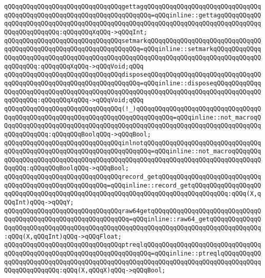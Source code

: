 \verb|qQQqqQQqqQQqqQQqqQQqqQQqqQQqqQQqgettagqQQqqQQqqQQqqQQqqQQqqQQqqQQqqQQqqQQqqQQqqQQqqQQqqQQqqQQqqQQqqQQqqQQqqQQq=qQQqinline::gettagqQQqqQQqqQQqqQQqqQQqqQQqqQQqqQQqqQQqqQQqqQQqqQQqqQQqqQQqqQQqqQQqqQQqqQQqqQQqqQQqqQQqqQQqqQQqqQQq:qQQqqQQqXqQQq->qQQqInt;|\newline
\verb|qQQqqQQqqQQqqQQqqQQqqQQqqQQqqQQqsetmarkqQQqqQQqqQQqqQQqqQQqqQQqqQQqqQQqqQQqqQQqqQQqqQQqqQQqqQQqqQQqqQQqqQQq=qQQqinline::setmarkqQQqqQQqqQQqqQQqqQQqqQQqqQQqqQQqqQQqqQQqqQQqqQQqqQQqqQQqqQQqqQQqqQQqqQQqqQQqqQQqqQQqqQQqqQQq:qQQqqQQqXqQQq->qQQqVoid;qQQq|\newline
\verb|qQQqqQQqqQQqqQQqqQQqqQQqqQQqqQQqdisposeqQQqqQQqqQQqqQQqqQQqqQQqqQQqqQQqqQQqqQQqqQQqqQQqqQQqqQQqqQQqqQQqqQQq=qQQqinline::disposeqQQqqQQqqQQqqQQqqQQqqQQqqQQqqQQqqQQqqQQqqQQqqQQqqQQqqQQqqQQqqQQqqQQqqQQqqQQqqQQqqQQqqQQqqQQq:qQQqqQQqXqQQq->qQQqVoid;qQQq|\newline
\newline
\verb|qQQqqQQqqQQqqQQqqQQqqQQqqQQqqQQq(!_)qQQqqQQqqQQqqQQqqQQqqQQqqQQqqQQqqQQqqQQqqQQqqQQqqQQqqQQqqQQqqQQqqQQqqQQqqQQqqQQq=qQQqinline::not_macroqQQqqQQqqQQqqQQqqQQqqQQqqQQqqQQqqQQqqQQqqQQqqQQqqQQqqQQqqQQqqQQqqQQqqQQqqQQqqQQqqQQq:qQQqqQQqBoolqQQq->qQQqBool;|\newline
\verb|qQQqqQQqqQQqqQQqqQQqqQQqqQQqqQQqinlnotqQQqqQQqqQQqqQQqqQQqqQQqqQQqqQQqqQQqqQQqqQQqqQQqqQQqqQQqqQQqqQQqqQQqqQQq=qQQqinline::not_macroqQQqqQQqqQQqqQQqqQQqqQQqqQQqqQQqqQQqqQQqqQQqqQQqqQQqqQQqqQQqqQQqqQQqqQQqqQQqqQQqqQQq:qQQqqQQqBoolqQQq->qQQqBool;|\newline
\newline
\verb|qQQqqQQqqQQqqQQqqQQqqQQqqQQqqQQqrecord_getqQQqqQQqqQQqqQQqqQQqqQQqqQQqqQQqqQQqqQQqqQQqqQQqqQQqqQQq=qQQqinline::record_getqQQqqQQqqQQqqQQqqQQqqQQqqQQqqQQqqQQqqQQqqQQqqQQqqQQqqQQqqQQqqQQqqQQqqQQqqQQqqQQq:qQQq(X,qQQqInt)qQQq->qQQqY;|\newline
\verb|qQQqqQQqqQQqqQQqqQQqqQQqqQQqqQQqraw64getqQQqqQQqqQQqqQQqqQQqqQQqqQQqqQQqqQQqqQQqqQQqqQQqqQQqqQQqqQQqqQQq=qQQqinline::raw64_getqQQqqQQqqQQqqQQqqQQqqQQqqQQqqQQqqQQqqQQqqQQqqQQqqQQqqQQqqQQqqQQqqQQqqQQqqQQqqQQqqQQq:qQQq(X,qQQqInt)qQQq->qQQqFloat;|\newline
\newline
\verb|qQQqqQQqqQQqqQQqqQQqqQQqqQQqqQQqptreqlqQQqqQQqqQQqqQQqqQQqqQQqqQQqqQQqqQQqqQQqqQQqqQQqqQQqqQQqqQQqqQQqqQQqqQQq=qQQqinline::ptreqlqQQqqQQqqQQqqQQqqQQqqQQqqQQqqQQqqQQqqQQqqQQqqQQqqQQqqQQqqQQqqQQqqQQqqQQqqQQqqQQqqQQqqQQqqQQqqQQq:qQQq(X,qQQqX)qQQq->qQQqBool;|\newline
\newline
